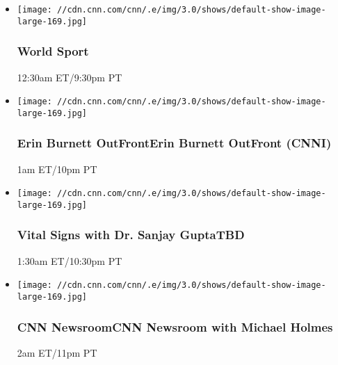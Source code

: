\begin{itemize}
\item
  \texttt{[image: //cdn.cnn.com/cnn/.e/img/3.0/shows/default-show-image-large-169.jpg]}

  \hypertarget{world-sport-5}{%
  \subsubsection{World Sport}\label{world-sport-5}}

  12:30am ET/9:30pm PT
\end{itemize}

\begin{itemize}
\item
  \texttt{[image: //cdn.cnn.com/cnn/.e/img/3.0/shows/default-show-image-large-169.jpg]}

  \hypertarget{erin-burnett-outfronterin-burnett-outfront-cnni--3}{%
  \subsubsection{Erin Burnett OutFrontErin Burnett OutFront (CNNI)
  }\label{erin-burnett-outfronterin-burnett-outfront-cnni--3}}

  1am ET/10pm PT
\end{itemize}

\begin{itemize}
\item
  \texttt{[image: //cdn.cnn.com/cnn/.e/img/3.0/shows/default-show-image-large-169.jpg]}

  \hypertarget{vital-signs-with-dr-sanjay-guptatbd--2}{%
  \subsubsection{Vital Signs with Dr. Sanjay GuptaTBD
  }\label{vital-signs-with-dr-sanjay-guptatbd--2}}

  1:30am ET/10:30pm PT
\end{itemize}

\begin{itemize}
\item
  \texttt{[image: //cdn.cnn.com/cnn/.e/img/3.0/shows/default-show-image-large-169.jpg]}

  \hypertarget{cnn-newsroomcnn-newsroom-with-michael-holmes--1}{%
  \subsubsection{CNN NewsroomCNN Newsroom with Michael Holmes
  }\label{cnn-newsroomcnn-newsroom-with-michael-holmes--1}}

  2am ET/11pm PT
\end{itemize}

